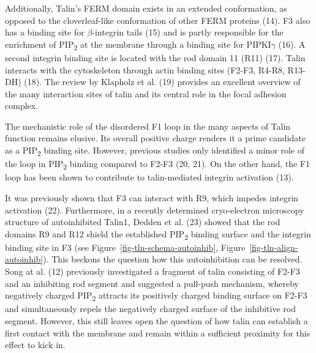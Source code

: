 \documentclass[
  twocolumn]{biophys-new-mod}
\begin{document}
Additionally, Talin's FERM domain exists in an extended conformation, as
opposed to the cloverleaf-like conformation of other FERM proteins (14).
F3 also has a binding site for \(\beta\)-integrin tails (15) and is
partly responsible for the enrichment of PIP\textsubscript{2} at the
membrane through a binding site for PIPKI\(\gamma\) (16). A second
integrin binding site is located with the rod domain 11 (R11) (17).
Talin interacts with the cytoskeleton through actin binding sites
(F2-F3, R4-R8, R13-DH) (18). The review by Klapholz et al. (19) provides
an excellent overview of the many interaction sites of talin and its
central role in the focal adhesion complex.

The mechanistic role of the disordered F1 loop in the many aspects of
Talin function remains elusive. Its overall positive charge renders it a
prime candidate as a PIP\textsubscript{2} binding site. However,
previous studies only identified a minor role of the loop in
PIP\textsubscript{2} binding compared to F2-F3 (20, 21). On the other
hand, the F1 loop has been shown to contribute to talin-mediated
integrin activation (13).

It was previously shown that F3 can interact with R9, which impedes
integrin activation (22). Furthermore, in a recently determined
cryo-electron microscopy structure of autoinhibited Talin1, Dedden et
al. (23) showed that the rod domains R9 and R12 shield the established
PIP\textsubscript{2} binding surface and the integrin binding site in F3
(see
Figure~\ref{fig-tln-schema-autoinhib}, Figure~\ref{fig-tln-align-autoinhib}).
This beckons the question how this autoinhibition can be resolved. Song
at al. (12) previously investigated a fragment of talin consisting of
F2-F3 and an inhibiting rod segment and suggested a pull-push mechanism,
whereby negatively charged PIP\textsubscript{2} attracts its positively
charged binding surface on F2-F3 and simultaneously repels the
negatively charged surface of the inhibitive rod segment. However, this
still leaves open the question of how talin can establish a first
contact with the membrane and remain within a sufficient proximity for
this effect to kick in.
\end{document}
